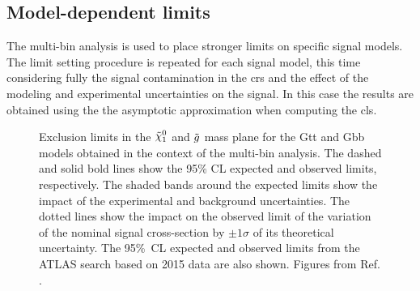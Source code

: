 \subsection{Model-dependent limits}

The multi-bin analysis is used to place stronger limits on specific signal models. 
The limit setting procedure is repeated for each signal model, this time considering fully the signal contamination in the 
\glspl{cr} and the effect of the modeling and experimental uncertainties on the signal. 
In this case the results are obtained using the the asymptotic approximation \cite{Cowan2011} when computing the \gls{cls}.


\begin{figure}[htbp]
	\centering 
	\caption{Exclusion limits in the $\ninoone$ and $\tilde{g}$ mass plane
  		for the  Gtt and   Gbb models obtained
		in the context of the multi-bin analysis. The dashed and solid bold lines
		show the 95\% CL expected and observed limits, respectively. The
  		shaded bands around the expected limits show the
                impact of the
  		experimental and background uncertainties. The dotted
  		lines show the impact on the observed limit of the variation of the
  		nominal signal cross-section by $\pm 1 \sigma$ of its theoretical
  		uncertainty. 
		The 95\%~CL expected and observed limits from the ATLAS search based on 2015 data 
  		\cite{Aad:2016eki} are also shown.  Figures from Ref. \cite{Aaboud:2017hrg}.}
	\label{fig:limits_GbbGtt}
\end{figure}

